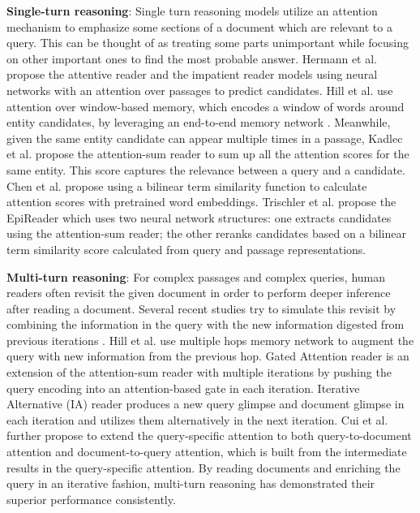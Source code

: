 \documentclass[sigconf]{acmart}
\begin{document}
{\bf Single-turn reasoning}:
Single turn reasoning models utilize an attention mechanism to emphasize some sections of a document which are relevant to a query. This can be thought of as treating some parts unimportant while focusing on other important ones to find the most probable answer. 
Hermann et al. \cite{HermannNIPS2015} propose the attentive reader and the impatient reader models using neural networks with an attention over passages to predict candidates.
Hill et al. \cite{HillICLR2016} use attention over window-based memory, which encodes a window of words around entity candidates, by leveraging an end-to-end memory network \citep{sukhbaatar2015end2endmn}.
Meanwhile, given the same entity candidate can appear multiple times in a passage, Kadlec et al. \cite{KadlecAttentionSum2016} propose the attention-sum reader to sum up all the attention scores for the same entity.  This score captures the relevance between a query and a candidate.  
Chen et al. \cite{ChenACL2016} propose using a bilinear term similarity function to calculate attention scores with pretrained word embeddings.
Trischler et al. \cite{Trischler2016EpiReader} propose the EpiReader which uses two neural network structures: one extracts candidates using the attention-sum reader; the other reranks candidates based on a bilinear term similarity score calculated from query and passage representations.


{\bf Multi-turn reasoning}:
For complex passages and complex queries, human readers often revisit the given document in order to perform deeper inference after reading a document. Several recent studies try to simulate this revisit by combining the information in the query with the new information digested from previous iterations \citep{HillICLR2016, Dhingra2016Gated, Sordoni2016IterativeAtt, Weissenborn2016, KumarMetamindICML2016}.
Hill et al. \cite{HillICLR2016} use multiple hops memory network to augment the query with new information from the previous hop. Gated Attention reader \citep{Dhingra2016Gated} is an extension of the attention-sum reader with multiple iterations by pushing the query encoding into an attention-based gate in each iteration.  
Iterative Alternative (IA) reader \citep{Sordoni2016IterativeAtt} produces a new query glimpse and document glimpse in each iteration and utilizes them alternatively in the next iteration. Cui et al. \cite{Cui2016AoA} further propose to extend the query-specific attention to both query-to-document attention and document-to-query attention, which is built from the intermediate results in the query-specific attention.
By reading documents and enriching the query in an iterative fashion, multi-turn reasoning has demonstrated their superior performance consistently.
\end{document}

